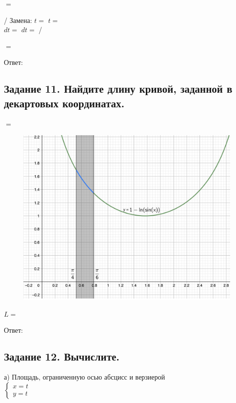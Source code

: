 \documentclass[12pt]{article}
\begin{document}
$=$\vspace{2.5mm}

/ Замена: $t= $  \hspace{2.5mm}  $t=$ \vspace{2.5mm}\\
$dt=$ \hspace{2.5mm} $dt=$ /\vspace{2.5mm}

$=$\vspace{2.5mm}

Ответ: $ $

\subsection*{Задание 11. Найдите длину кривой, заданной в декартовых координатах.}

$=$\vspace{2.5mm}

\begin{figure}[ht!]
\centering
\includegraphics[width=325pt]{Figures/11.png}
\end{figure}

$L=$\vspace{2.5mm}

Ответ: $ $

\subsection*{Задание 12. Вычислите.}

а) Площадь, ограниченную осью абсцисс и верзиерой\vspace{2.5mm}\\
$\begin{cases}x=t\\
y=t\end{cases}$ \vspace{2.5mm}\\
\end{document}
